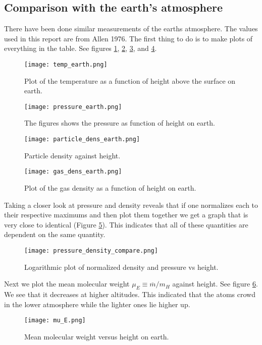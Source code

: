 \documentclass{aa}   %
\begin{document}
\subsection{Comparison with the earth's atmosphere}
There have been done similar measurements of the earths atmosphere. The values used in this report are from Allen 1976. 
The first thing to do is to make plots of everything in the table. See figures \ref{temp_earth}, \ref{pressure_earth}, \ref{particle_dens_earth}, and \ref{gas_dens_earth}.

\begin{figure}
 \texttt{[image: temp\_earth.png]}
 \caption{Plot of the temperature as a function of height above the surface on earth.}
 \label{temp_earth} 
\end{figure}

\begin{figure}
 \texttt{[image: pressure\_earth.png]}
 \caption{The figures shows the pressure as function of height on earth.}
 \label{pressure_earth} 
\end{figure}

\begin{figure}
 \texttt{[image: particle\_dens\_earth.png]}
 \caption{Particle density against height.}
 \label{particle_dens_earth} 
\end{figure}

\begin{figure}
 \texttt{[image: gas\_dens\_earth.png]}
 \caption{Plot of the gas density as a function of height on earth.}
 \label{gas_dens_earth} 
\end{figure}

Taking a closer look at pressure and density reveals that if one normalizes each to their respective maximums and then plot them together we get a graph that is very close to identical (Figure \ref{pressure_density_compare}). This indicates that all of these quantities are dependent on the same quantity. 
\begin{figure}
 \texttt{[image: pressure\_density\_compare.png]}
 \caption{Logarithmic plot of normalized density and pressure vs height.}
 \label{pressure_density_compare} 
\end{figure}
Next we plot the mean molecular weight $\mu_E \equiv \overline{m}/m_H$ against height. See figure \ref{mu_E}. We see that it decreases at higher altitudes. This indicated that the atoms crowd in the lower atmosphere while the lighter ones lie higher up.
\begin{figure}
 \texttt{[image: mu\_E.png]}
 \caption{Mean molecular weight versus height on earth.}
 \label{mu_E} 
\end{figure}
\end{document}
